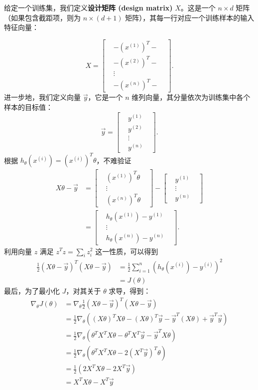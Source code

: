 给定一个训练集，我们定义\textbf{设计矩阵 (design matrix)} $X$。这是一个 $n \times d$ 矩阵（如果包含截距项，则为 $n \times (d+1)$ 矩阵），其每一行对应一个训练样本的输入特征向量：

\[
    X = \begin{bmatrix} &- (x^{(1)})^T -& \\ &- (x^{(2)})^T -& \\ &\vdots& \\ &- (x^{(n)})^T -& \end{bmatrix}.
\]
进一步地，我们定义向量 $\vec{y}$，它是一个 $n$ 维列向量，其分量依次为训练集中各个样本的目标值：
\[
    \vec{y} = \begin{bmatrix} &y^{(1)}& \\ &y^{(2)}& \\ &\vdots& \\ &y^{(n)}& \end{bmatrix}.
\]
根据 $h_\theta(x^{(i)}) = (x^{(i)})^T \theta$，不难验证
\[
    \begin{aligned}
        X\theta - \vec{y} 
        &= \begin{bmatrix} &(x^{(1)})^T \theta& \\ &\vdots& \\ &(x^{(n)})^T \theta& \end{bmatrix} - \begin{bmatrix} &y^{(1)}& \\ &\vdots& \\ &y^{(n)}& \end{bmatrix} \\
        &= \begin{bmatrix} &h_\theta(x^{(1)}) - y^{(1)}& \\ &\vdots& \\ &h_\theta(x^{(n)}) - y^{(n)}& \end{bmatrix}.
    \end{aligned}
\]
利用向量 $z$ 满足 $z^T z = \sum_i z_i^2$ 这一性质，可以得到
\[
    \begin{aligned}
        \frac{1}{2}(X\theta - \vec{y})^T (X\theta - \vec{y}) 
        &= \frac{1}{2} \sum_{i=1}^n (h_\theta (x^{(i)}) - y^{(i)})^2 \\
        &= J(\theta)
    \end{aligned}
\]
最后，为了最小化 $J$，对其关于 $\theta$ 求导，得到：
\[
    \begin{aligned}
        \nabla_\theta J(\theta) &= \nabla_\theta \frac{1}{2} (X\theta - \vec{y})^T (X\theta - \vec{y}) \\
        &= \frac{1}{2} \nabla_\theta ((X\theta)^T X\theta - (X\theta)^T \vec{y} - \vec{y}^T (X\theta) + \vec{y}^T \vec{y}) \\
        &= \frac{1}{2} \nabla_\theta (\theta^T X^T X\theta - \theta^T X^T \vec{y} - \vec{y}^T X\theta) \\
        &= \frac{1}{2} \nabla_\theta (\theta^T X^T X\theta - 2(X^T \vec{y})^T \theta) \\
        &= \frac{1}{2} (2 X^T X\theta - 2 X^T \vec{y}) \\
        &= X^T X\theta - X^T \vec{y}
    \end{aligned}
\]
